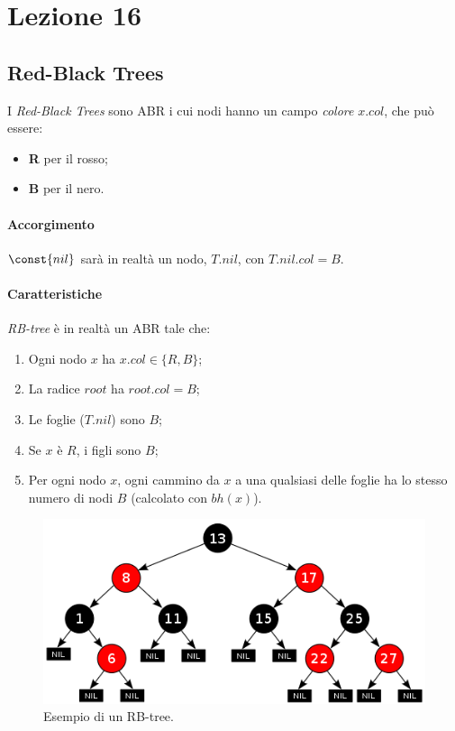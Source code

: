 \section{Lezione 16}

\subsection{Red-Black Trees}

I \emph{Red-Black Trees} sono ABR i cui nodi hanno un campo \emph{colore} $x.col$, che può essere:
\begin{itemize}[noitemsep]
    \item \textbf{R} per il rosso;
    \item \textbf{B} per il nero.
\end{itemize}

\paragraph{Accorgimento} $\const{nil}$ sarà in realtà un nodo,
$T.nil$, con $T.nil.col = B$.

\paragraph{Caratteristiche} \emph{RB-tree} è in realtà un ABR tale che:
\begin{enumerate}[label=($\arabic*$)]
    \item Ogni nodo $x$ ha $x.col \in \{R,B\}$; \label{rbtree:1}
    \item La radice $root$ ha $root.col = B$; \label{rbtree:2}
    \item Le foglie ($T.nil$) sono $B$; \label{rbtree:3}
    \item Se $x$ è $R$, i figli sono $B$; \label{rbtree:4}
    \item Per ogni nodo $x$, ogni cammino da $x$ a una qualsiasi delle foglie
    ha lo stesso numero di nodi $B$ (calcolato con $bh(x)$). \label{rbtree:5}
\end{enumerate} 

\begin{figure}[hbt]
    \centering
    \includegraphics[width=\textwidth]{img/rb-tree-ex.png}
    \caption{Esempio di un RB-tree.}
\end{figure}
\pagebreak

